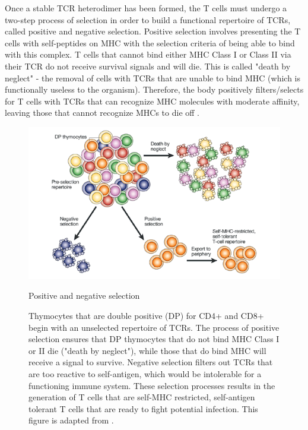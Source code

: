 Once a stable TCR heterodimer has been formed, the T cells must undergo a two-step process of selection in order to build a functional repertoire of TCRs, called positive and negative selection. Positive selection involves presenting the T cells with self-peptides on MHC with the selection criteria of being able to bind with this complex. T cells that cannot bind either MHC Class I or Class II via their TCR do not receive survival signals and will die. This is called "death by neglect" - the removal of cells with TCRs that are unable to bind MHC (which is functionally useless to the organism). Therefore, the body positively filters/selects for T cells with TCRs that can recognize MHC molecules with moderate affinity, leaving those that cannot recognize MHCs to die off \cite{Palmer2003}.

\begin{figure}[htbp]
	\centering
	\includegraphics[width=\textwidth]{../figures/chapter1/posnegsel.png}
	\caption{Positive and negative selection}
	\caption*{Thymocytes that are double positive (DP) for CD4+ and CD8+ begin with an unselected repertoire of TCRs. The process of positive selection ensures that DP thymocytes that do not bind MHC Class I or II die ("death by neglect"), while those that do bind MHC will receive a signal to survive. Negative selection filters out TCRs that are too reactive to self-antigen, which would be intolerable for a functioning immune system. These selection processes results in the generation of T cells that are self-MHC restricted, self-antigen tolerant T cells that are ready to fight potential infection. This figure is adapted from \cite{Palmer2003}.}
	\label{fig:posnegsel}
\end{figure}

